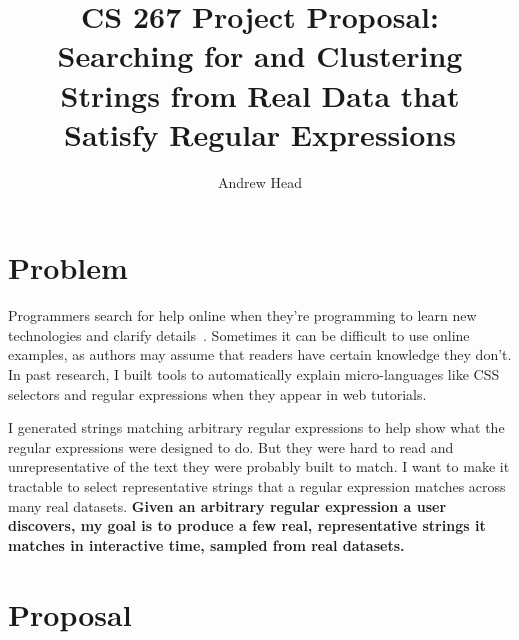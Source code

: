 \documentclass[10pt]{article}
\begin{document}
\title{\Large CS 267 Project Proposal: Searching for and Clustering \\
Strings from Real Data that Satisfy Regular Expressions}
\author{\large Andrew Head}
\date{}
\maketitle

\titleformat{\section}{\normalfont\fontsize{10}{11}\bfseries}{\thesection}{1em}{}


\vspace{-5ex}
\section{Problem}

Programmers search for help online when they're programming to learn new technologies and clarify details~\cite{brandt_two_2009}.
Sometimes it can be difficult to use online examples, as authors may assume that readers have certain knowledge they don't.
In past research, I built tools to automatically explain micro-languages like CSS selectors and regular expressions when they appear in web tutorials.%

I generated strings matching arbitrary regular expressions to help show what the regular expressions were designed to do.
But they were hard to read and unrepresentative of the text they were probably built to match.
I want to make it tractable to select representative strings that a regular expression matches across many real datasets.
\textbf{Given an arbitrary regular expression a user discovers, my goal is to produce
a few real, representative strings it matches in interactive time, sampled from real datasets.}

\section{Proposal}
\end{document}
